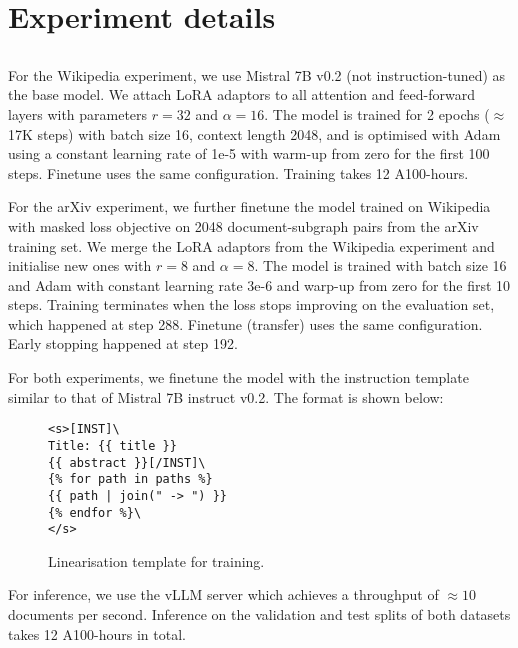 \appendix

\chapter{Experiment details}  \label{appendix:exp-details}

\section{\name}  \label{appendix:training-details}

For the Wikipedia experiment, we use Mistral 7B v0.2 (not instruction-tuned) \cite{jiang2023mistral} as the base model. We attach LoRA \cite{hu2021lora} adaptors to all attention and feed-forward layers with parameters $r=32$ and $\alpha=16$. The model is trained for 2 epochs ($\approx$ 17K steps) with batch size 16, context length 2048, and is optimised with Adam using a constant learning rate of 1e-5 with warm-up from zero for the first 100 steps. Finetune uses the same configuration. Training takes 12 A100-hours.

For the arXiv experiment, we further finetune the model trained on Wikipedia with masked loss objective on 2048 document-subgraph pairs from the arXiv training set. We merge the LoRA adaptors from the Wikipedia experiment and initialise new ones with $r=8$ and $\alpha=8$. The model is trained with batch size 16 and Adam with constant learning rate 3e-6 and warp-up from zero for the first 10 steps. Training terminates when the loss stops improving on the evaluation set, which happened at step 288. Finetune (transfer) uses the same configuration. Early stopping happened at step 192.

For both experiments, we finetune the model with the instruction template similar to that of Mistral 7B instruct v0.2. The format is shown below:

\begin{figure}[h]
    \centering
    \begin{lstlisting}[frame=single]
<s>[INST]\
Title: {{ title }}
{{ abstract }}[/INST]\
{% for path in paths %}
{{ path | join(" -> ") }}
{% endfor %}\
</s>
\end{lstlisting}
    \caption{Linearisation template for \name training.}
    \label{fig:linearisation-template}
\end{figure}

For inference, we use the vLLM \cite{kwon2023efficient} server which achieves a throughput of $\approx 10$ documents per second. Inference on the validation and test splits of both datasets takes 12 A100-hours in total.

